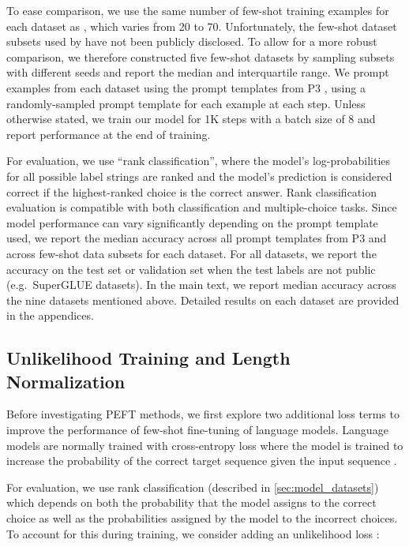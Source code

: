 \documentclass{article}
\begin{document}
To ease comparison, we use the same number of few-shot training examples for each dataset as \citet{brown2020language}, which varies from 20 to 70.
Unfortunately, the few-shot dataset subsets used by \citet{brown2020language} have not been publicly disclosed.
To allow for a more robust comparison, we therefore constructed five few-shot datasets by sampling subsets with different seeds and report the median and interquartile range.
We prompt examples from each dataset using the prompt templates from P3 \citet{bach2022promptsource}, using a randomly-sampled prompt template for each example at each step.
Unless otherwise stated, we train our model for 1K steps with a batch size of 8 and report performance at the end of training.

For evaluation, we use ``rank classification'', where the model's log-probabilities for all possible label strings are ranked and the model's prediction is considered correct if the highest-ranked choice is the correct answer.
Rank classification evaluation is compatible with both classification and multiple-choice tasks.
Since model performance can vary significantly depending on the prompt template used, we report the median accuracy across all prompt templates from P3 and across few-shot data subsets for each dataset.
For all datasets, we report the accuracy on the test set or validation set when the test labels are not public (e.g.\ SuperGLUE datasets).
In the main text, we report median accuracy across the nine datasets mentioned above.
Detailed results on each dataset are provided in the appendices.


\subsection{Unlikelihood Training and Length Normalization}
\label{sec:ul_ln}

Before investigating PEFT methods, we first explore two additional loss terms to improve the performance of few-shot fine-tuning of language models.
Language models are normally trained with cross-entropy loss  where the model is trained to increase the probability of the correct target sequence  given the input sequence . 

For evaluation, we use rank classification (described in \cref{sec:model_datasets}) which depends on both the probability that the model assigns to the correct choice as well as the probabilities assigned by the model to the incorrect choices.
To account for this during training, we consider adding an unlikelihood loss \cite{tam2021improving,welleck2019neural}:
\end{document}
